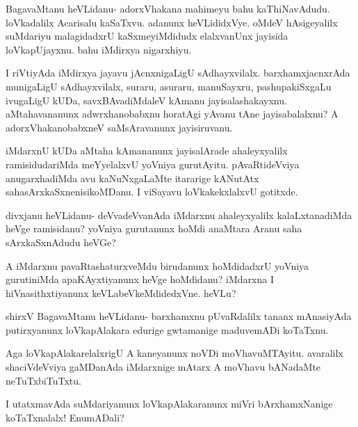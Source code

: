 \documentclass{article}
\begin{document}
\begin{mng}%
BagavaMtanu heVLidanu- adorxVhakana mahimeyu bahu kaThiNavAdudu.
loVkadalilx Acarisalu kaSaTxvu. adanunx heVLididxVye. oMdeV
hAsigeyalilx suMdariyu malagidadxrU kaSxmeyiMdidudx elalxvanUnx jayisida
loVkapUjayxnu. bahu iMdirxya nigarxhiyu.
\end{mng}

\begin{mng}%
I riVtiyAda iMdirxya jayavu jAcnxnigaLigU sAdhayxvilalx.
barxhamxjacnxrAda munigaLigU sAdhayxvilalx, suraru, asuraru, manuSayxru,
pashupakiSxgaLu ivugaLigU kUDa, savxBAvadiMdaleV kAmanu jayisalashakayxnu.
aMtahavananunx adwrxhanobabxnu horatAgi yAvanu tAne jayisabalalxnu?
A adorxVhakanobabxneV saMsAravanunx jayisiruvanu.
\end{mng}

\begin{mng}%
iMdarxnU kUDa aMtaha kAmananunx jayisalArade ahaleyxyalilx
ramisidudariMda meYyelalxvU yoVniya gurutAyitu. pAvaRtideVviya
anugarxhadiMda avu kaNuNxgaLaMte itararige kANutAtx sahasArxkaSxnenisikoMDanu.
I viSayavu loVkakekxlalxvU gotitxde.
\end{mng}

\begin{mng}%
divxjanu heVLidanu- deVvadeVvanAda iMdarxnu ahaleyxyalilx kalaLxtanadiMda
heVge ramisidanu? yoVniya gurutanunx hoMdi anaMtara Aranu
saha sArxkaSxnAdudu heVGe?
\end{mng}

\begin{mng}%
A iMdarxnu pavaRtashaturxveMdu birudanunx hoMdidadxrU yoVniya
gurutiniMda apaKAyxtiyanunx heVge hoMdidanu? iMdarxna I hiVnasithxtiyanunx
keVLabeVkeMdidedxVne. heVLu?
\end{mng}

\begin{mng}%
shirxV BagavaMtanu heVLidanu- barxhamxnu pUvaRdalilx tananx mAnasiyAda
putirxyanunx loVkapAlakara edurige gwtamanige maduvemADi
koTaTxnu.
\end{mng}

\begin{mng}%
Aga loVkapAlakarelalxrigU A kaneyanunx noVDi moVhavuMTAyitu.
avaralilx shaciVdeVviya gaMDanAda iMdarxnige mAtarx A moVhavu
bANadaMte neTuTxbiTuTxtu.
\end{mng}

\begin{mng}%
I utatxmavAda suMdariyanunx loVkapAlakaranunx miVri
bArxhamxNanige koTaTxnalalx! EnumADali?
\end{mng}
\end{document}
